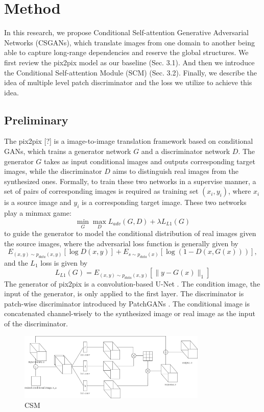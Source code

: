 \section{Method}
In this research, we propose Conditional Self-attention Generative Adversarial Networks (CSGANs), which translate images from one domain to another being able to capture long-range dependencies and reserve the global structures. We first review the pix2pix model as our baseline (Sec. 3.1). And then we introduce the Conditional Self-attention Module (SCM) (Sec. 3.2). Finally, we describe the idea of multiple level patch discriminator and the loss we utilize to achieve this idea.
\subsection{Preliminary}
The pix2pix [?] is a image-to-image translation framework based on conditional GANs, which trains a generator network $G$ and a discriminator network $D$. The generator $G$ takes as input conditional images and outputs corresponding target images, while the discriminator $D$ aims to distinguish real images from the synthesized ones. Formally, to train these two networks in a supervise manner, a set of pairs of corresponding images is required as training set ${(x_i, y_i)}$, where $x_i$ is a source image and $y_i$ is a corresponding target image. These two networks play a minmax game:
\begin{equation}
\label{eqn:minmax_game}
\min_G \max_D L_{adv}(G,D)+\lambda L_{L1}(G)
\end{equation}
to guide the generator to model the conditional distribution of real images given the source images, where the adversarial loss function is generally given by 
\begin{equation}
\label{eqn:loss_adv}
E_{(x,y)\sim p_{data}(x,y)}[\log D(x,y)]+E_{s\sim p_{data}(x)}[\log(1-D(x,G(x)))],
\end{equation}
and the $L_1$ loss is given by
\begin{equation}
\label{eqn:loss_l1}
L_{L1}(G)=E_{(x,y)\sim p_{data}(x,y)}[\|y-G(x)\|_1]
\end{equation}
The generator of pix2pix is a convolution-based U-Net \cite{Unet}. The condition image, the input of the generator, is only applied to the first layer. The discriminator is patch-wise discriminator introduced by PatchGANs \cite{PatchGANs}. The conditional image is concatenated channel-wisely to the synthesized image or real image as the input of the discriminator.
%
%
\begin{figure}
	\label{fig:CSM}
	\includegraphics[width=0.8\textwidth]{figures/CSM}
	\caption{CSM}
\end{figure}
%
%
